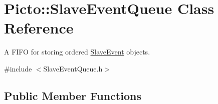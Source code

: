 \hypertarget{class_picto_1_1_slave_event_queue}{\section{Picto\-:\-:Slave\-Event\-Queue Class Reference}
\label{class_picto_1_1_slave_event_queue}
}


A F\-I\-F\-O for storing ordered \hyperlink{class_picto_1_1_slave_event}{Slave\-Event} objects.  




{\ttfamily \#include $<$Slave\-Event\-Queue.\-h$>$}

\subsection*{Public Member Functions}
